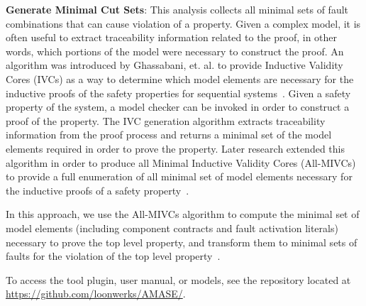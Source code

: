 \textbf{Generate Minimal Cut Sets}: This analysis collects all minimal sets of fault combinations that can cause violation of a property.
Given a complex model, it is often useful to extract traceability information related to the proof, in other words, which portions of the model were necessary to construct the proof. An algorithm was introduced by Ghassabani, et. al. to provide Inductive Validity Cores (IVCs) as a way to determine which model elements are necessary for the inductive proofs of the safety properties for sequential systems~\cite{GhassabaniGW16}. Given a safety property of the system, a model checker can be invoked in order to construct a proof of the property. The IVC generation algorithm extracts traceability information from the proof process and returns a minimal set of the model elements required in order to prove the property. Later research extended this algorithm in order to produce all Minimal Inductive Validity Cores (All-MIVCs) to provide a full enumeration of all minimal set of model elements necessary for the inductive proofs of a safety property~\cite{Ghassabani2017EfficientGO}. 

In this approach, we use the All-MIVCs algorithm to compute the minimal set of model elements (including component contracts and fault activation literals) necessary to prove the top level property, and transform them to minimal sets of faults for the violation of the top level property~\cite{nasaFinalReport}. 

To access the tool plugin, user manual, or models, see the repository located at \small \url{https://github.com/loonwerks/AMASE/}. \normalsize 























